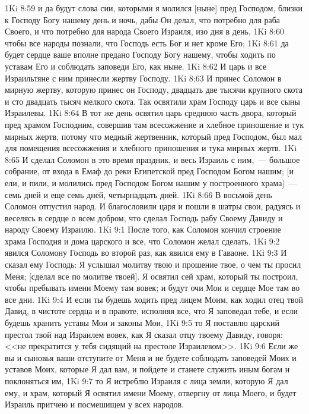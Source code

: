 \vs 1Ki 8:59 и да будут слова сии, которыми я молился [ныне] пред Господом, близки к Господу Богу нашему день и ночь, дабы Он делал, что потребно для раба Своего, и что потребно для народа Своего Израиля, изо дня в день,
\vs 1Ki 8:60 чтобы все народы познали, что Господь есть Бог и нет кроме Его;
\vs 1Ki 8:61 да будет сердце ваше вполне предано Господу Богу нашему, чтобы ходить по уставам Его и соблюдать заповеди Его, как ныне.
\rsbpar\vs 1Ki 8:62 И царь и все Израильтяне с ним принесли жертву Господу.
\vs 1Ki 8:63 И принес Соломон в мирную жертву, которую принес он Господу, двадцать две тысячи крупного скота и сто двадцать тысяч мелкого скота. Так освятили храм Господу царь и все сыны Израилевы.
\vs 1Ki 8:64 В тот же день освятил царь среднюю часть двора, который пред храмом Господним, совершив там всесожжение и хлебное приношение и  тук мирных жертв, потому что медный жертвенник, который пред Господом, был мал для помещения всесожжения и хлебного приношения и тука мирных жертв.
\vs 1Ki 8:65 И сделал Соломон в это время праздник, и весь Израиль с ним,~--- большое собрание,  от входа в Емаф до реки Египетской пред Господом Богом нашим; [и ели, и пили, и молились пред Господом Богом нашим у построенного храма]~--- семь дней и еще семь дней, четырнадцать дней.
\vs 1Ki 8:66 В восьмой день Соломон отпустил народ. И благословили царя и пошли в шатры свои, радуясь и веселясь в сердце о всем добром, что сделал Господь рабу Своему Давиду и народу Своему Израилю.
\vs 1Ki 9:1 После того, как Соломон кончил строение храма Господня и дома царского и все, что Соломон желал сделать,
\vs 1Ki 9:2 явился Соломону Господь во второй раз, как явился ему в Гаваоне.
\vs 1Ki 9:3 И сказал ему Господь: Я услышал молитву твою и прошение твое, о чем ты просил Меня; [сделал все по молитве твоей]. Я освятил сей храм, который ты построил, чтобы пребывать имени Моему там вовек; и будут очи Мои и сердце Мое там во все дни.
\vs 1Ki 9:4 И если ты будешь ходить пред лицем Моим, как ходил отец твой Давид, в чистоте сердца и в правоте, исполняя все, что Я заповедал тебе, и если будешь хранить уставы Мои и законы Мои,
\vs 1Ki 9:5 то Я поставлю царский престол твой над Израилем вовек, как Я сказал отцу твоему Давиду, говоря: <<не прекратится у тебя сидящий на престоле Израилевом>>.
\vs 1Ki 9:6 Если же вы и сыновья ваши отступите от Меня и не будете соблюдать заповедей Моих и уставов Моих, которые Я дал вам, и пойдете и станете служить иным богам и поклоняться им,
\vs 1Ki 9:7 то Я истреблю Израиля с лица земли, которую Я дал ему, и храм, который Я освятил имени Моему, отвергну от лица Моего, и будет Израиль притчею и посмешищем у всех народов.
